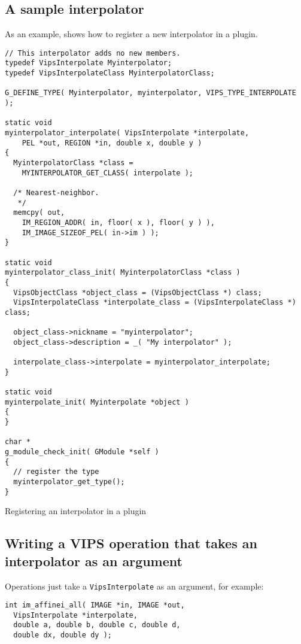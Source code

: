 \subsection{A sample interpolator}

As an example,  shows how to register a new
interpolator in a plugin.

\begin{fig2}
\begin{verbatim}
// This interpolator adds no new members.
typedef VipsInterpolate Myinterpolator;
typedef VipsInterpolateClass MyinterpolatorClass;

G_DEFINE_TYPE( Myinterpolator, myinterpolator, VIPS_TYPE_INTERPOLATE );

static void
myinterpolator_interpolate( VipsInterpolate *interpolate, 
	PEL *out, REGION *in, double x, double y )
{
  MyinterpolatorClass *class = 
    MYINTERPOLATOR_GET_CLASS( interpolate );

  /* Nearest-neighbor.
   */
  memcpy( out, 
    IM_REGION_ADDR( in, floor( x ), floor( y ) ),
    IM_IMAGE_SIZEOF_PEL( in->im ) );
}

static void
myinterpolator_class_init( MyinterpolatorClass *class )
{
  VipsObjectClass *object_class = (VipsObjectClass *) class;
  VipsInterpolateClass *interpolate_class = (VipsInterpolateClass *) class;

  object_class->nickname = "myinterpolator";
  object_class->description = _( "My interpolator" );

  interpolate_class->interpolate = myinterpolator_interpolate;
}

static void
myinterpolate_init( Myinterpolate *object )
{
}

char *
g_module_check_init( GModule *self )
{
  // register the type
  myinterpolator_get_type(); 
}
\end{verbatim}
\caption{Registering an interpolator in a plugin}
\label{fg:newinterpolator}
\end{fig2}

\subsection{Writing a VIPS operation that takes an interpolator as an argument}

Operations just take a \verb+VipsInterpolate+ as an argument, for example:

\begin{verbatim}
int im_affinei_all( IMAGE *in, IMAGE *out, 
  VipsInterpolate *interpolate,
  double a, double b, double c, double d, 
  double dx, double dy );
\end{verbatim}

